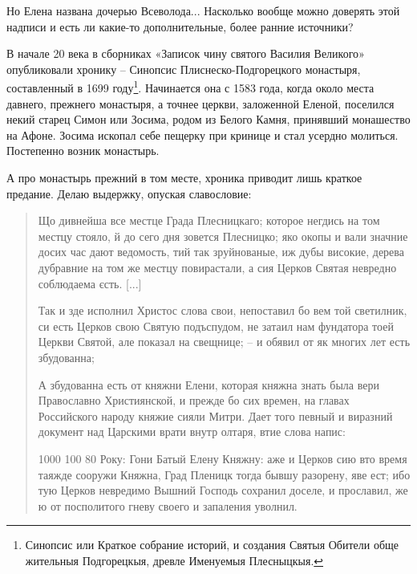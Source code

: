Но Елена названа дочерью Всеволода... Насколько вообще можно доверять этой надписи и есть ли какие-то дополнительные, более ранние источники?

В начале 20 века в сборниках «Записок чину святого Василия Великого» опубликовали хронику – Синопсис Плиснеско-Подгорецкого монастыря, составленный в 1699 году\footnote{Синопсис или Краткое собрание историй, и создания Святыя Обители обще жительныя Подгорецкыя, древле Именуемыя Плесныцкыя.}. Начинается она с 1583 года, когда около места давнего, прежнего монастыря, а точнее церкви, заложенной Еленой, поселился некий старец Симон или Зосима, родом из Белого Камня, принявший монашество на Афоне. Зосима ископал себе пещерку при кринице и стал усердно молиться. Постепенно возник монастырь.

А про монастырь прежний в том месте, хроника приводит лишь краткое предание. Делаю выдержку, опуская славословие\cite[102]{zapvas01}:

\begin{quotation}

Що дивнейша все местце Града Плесницкаго; которое негдись на том местцу стояло, й до сего дня зовется Плесницко; яко окопы и вали значние досих час дают ведомость, тий так зруйнованые, иж дубы високие, дерева дубравние на том же местцу повирастали, а сия Церков Святая невредно соблюдаема єсть. [...]

Так и зде исполнил Христос слова свои, непоставил бо вем той светилник, си есть Церков свою Святую подъспудом, не затаил нам фундатора тоей Церкви Святой, але показал на свещнице; – и обявил от як многих лет есть збудованна;

А збудованна есть от княжни Елени, которая княжна знать была вери Православно Християнской, и прежде бо сих времен, на главах Российского народу княжие сияли Митри. Дает того певный и виразний документ над Царскими врати внутр олтаря, втие слова напис: 

1000 100 80 Року: Гони Батый Елену Княжну: аже и Церков сию вто время таяжде сооружи Княжна, Град Пленицк тогда бывшу разорену, яве ест; ибо тую Церков невредимо Вышний Господь сохранил доселе, и прославил, же ю от посполитого гневу своего и запаления уволнил. 
\end{quotation}

